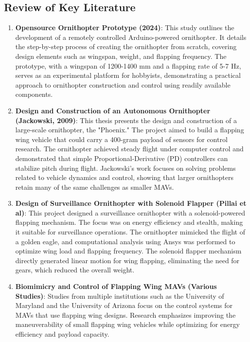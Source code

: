 \subsection{Review of Key Literature}
\begin{enumerate}
    \item \textbf{Opensource Ornithopter Prototype (2024)}: This study outlines the development of a remotely controlled Arduino-powered ornithopter. It details the step-by-step process of creating the ornithopter from scratch, covering design elements such as wingspan, weight, and flapping frequency. The prototype, with a wingspan of 1200-1400 mm and a flapping rate of 5-7 Hz, serves as an experimental platform for hobbyists, demonstrating a practical approach to ornithopter construction and control using readily available components.
    
    \item \textbf{Design and Construction of an Autonomous Ornithopter (Jackowski, 2009)}: This thesis presents the design and construction of a large-scale ornithopter, the "Phoenix." The project aimed to build a flapping wing vehicle that could carry a 400-gram payload of sensors for control research. The ornithopter achieved steady flight under computer control and demonstrated that simple Proportional-Derivative (PD) controllers can stabilize pitch during flight. Jackowski's work focuses on solving problems related to vehicle dynamics and control, showing that larger ornithopters retain many of the same challenges as smaller MAVs.
    
    \item \textbf{Design of Surveillance Ornithopter with Solenoid Flapper (Pillai et al)}: This project designed a surveillance ornithopter with a solenoid-powered flapping mechanism. The focus was on energy efficiency and stealth, making it suitable for surveillance operations. The ornithopter mimicked the flight of a golden eagle, and computational analysis using Ansys was performed to optimize wing load and flapping frequency. The solenoid flapper mechanism directly generated linear motion for wing flapping, eliminating the need for gears, which reduced the overall weight.
    
    \item \textbf{Biomimicry and Control of Flapping Wing MAVs (Various Studies)}: Studies from multiple institutions such as the University of Maryland and the University of Arizona focus on the control systems for MAVs that use flapping wing designs. Research emphasizes improving the maneuverability of small flapping wing vehicles while optimizing for energy efficiency and payload capacity.
\end{enumerate}

